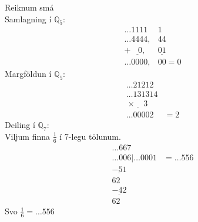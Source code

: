 \begin{daemi}
Reiknum smá \\
Samlagning í $\mathbb{Q}_5$:\\
\begin{align*}
\ldots 1111\ &1 \\
\ldots 4444,&44 \\
+\ \underline{\mbox{          } 0},&\underline{01} \\
\ldots 0000,&00 = 0
\end{align*}
Margföldun í $\mathbb{Q}_5$:\\
\begin{align*}
\ldots 21212\ \ & \\
\ldots 131314& \\
\ \underline{\times \ \ \ \ \  3}& \\
\ldots 00002 &= 2
\end{align*}
Deiling í $\mathbb{Q}_7$:\\
Viljum finna $\frac{1}{6}$ í 7-legu tölunum.
\begin{align*}
\ldots 667\ \ & \\
\ldots 006|\ldots 0001& = \ldots 556 \\
\underline{-51}& \\
62 \ \ & \\
\underline{-42} \ \ & \\
62 \ \ \ \ &
\end{align*}
Svo $\frac{1}{6} = \ldots 556$


\end{daemi}

